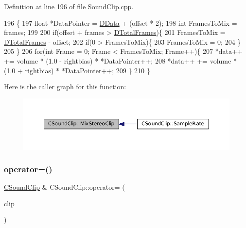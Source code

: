 Definition at line 196 of file Sound\+Clip.\+cpp.


\begin{DoxyCode}
196                                                                                                 \{
197     \textcolor{keywordtype}{float} *DataPointer = \hyperlink{classCSoundClip_a220921a0c81e5c63e2cd3c55c75878b1}{DData} + (offset * 2);
198     \textcolor{keywordtype}{int} FramesToMix = frames;
199     
200     \textcolor{keywordflow}{if}(offset + frames > \hyperlink{classCSoundClip_ab0d9eb261d09fa2a106658276f37285b}{DTotalFrames})\{
201         FramesToMix = \hyperlink{classCSoundClip_ab0d9eb261d09fa2a106658276f37285b}{DTotalFrames} - offset;
202         \textcolor{keywordflow}{if}(0 > FramesToMix)\{
203             FramesToMix = 0;
204         \}
205     \}
206     \textcolor{keywordflow}{for}(\textcolor{keywordtype}{int} Frame = 0; Frame < FramesToMix; Frame++)\{
207         *data++ += volume * (1.0 - rightbias) * *DataPointer++;
208         *data++ += volume * (1.0 + rightbias) * *DataPointer++;
209     \}
210 \}
\end{DoxyCode}
Here is the caller graph for this function\+:
\nopagebreak
\begin{figure}[H]
\begin{center}
\leavevmode
\includegraphics[width=350pt]{classCSoundClip_a54fb05ee6936503af55650b10c861967_icgraph}
\end{center}
\end{figure}
\hypertarget{classCSoundClip_a4ab9ebe61c3b5ee9545e1167e53faeb3}{}\label{classCSoundClip_a4ab9ebe61c3b5ee9545e1167e53faeb3} 
\subsubsection{\texorpdfstring{operator=()}{operator=()}}
{\footnotesize\ttfamily \hyperlink{classCSoundClip}{C\+Sound\+Clip} \& C\+Sound\+Clip\+::operator= (\begin{DoxyParamCaption}\item[{const \hyperlink{classCSoundClip}{C\+Sound\+Clip} \&}]{clip }\end{DoxyParamCaption})}



